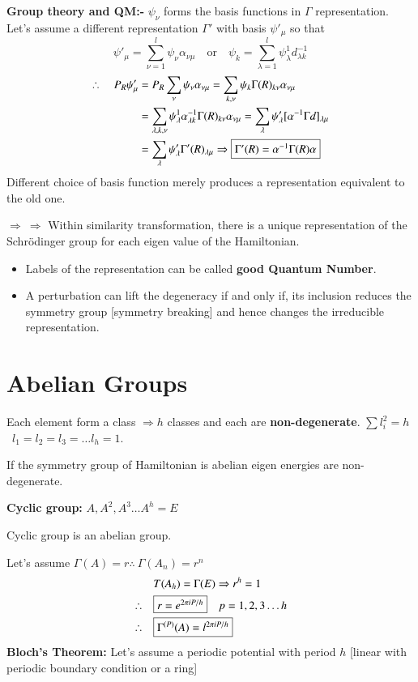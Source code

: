 \noindent
{\bf Group theory and QM:-}
$\psi_{\nu}$ forms the basis functions in $\Gamma$ representation. Let's assume a different representation $\Gamma'$ with basis $\psi'_{\mu}$ so that 
$$
\psi'_{\mu}=\sum\limits^{l}_{\nu=1}\psi_{\nu}\alpha_{\nu\mu}\quad\text{or}\quad \psi_{k}=\sum\limits^{l}_{\lambda=1}\psi^{1}_{\lambda}d^{-1}_{\lambda k}
$$
\begin{align*}
\therefore\quad P_{R}\psi'_{\mu} &= P_{R}\sum\limits_{\nu}\psi_{\nu}\alpha_{\nu\mu}=\sum\limits_{k,\nu}\psi_{k}\Gamma(R)_{k\nu}\alpha_{\nu\mu}\\
&= \sum\limits_{\lambda,k,\nu}\psi^{1}_{\lambda}\alpha^{-1}_{\lambda k}\Gamma(R)_{k\nu}\alpha_{\nu\mu}=\sum\limits_{\lambda}\psi'_{\lambda}[\alpha^{-1}\Gamma d]_{\lambda\mu}\\
&= \sum\limits_{\lambda}\psi'_{\lambda}\Gamma'(R)_{\lambda\mu}\Rightarrow \fbox{$\Gamma'(R)=\alpha^{-1}\Gamma(R)\alpha$}
\end{align*}
Different choice of basis function merely produces a representation equivalent to the old one.

$\Rightarrow \ \Rightarrow$ Within similarity transformation, there is a unique representation of the Schr\"odinger group for each eigen value of the Hamiltonian.
\begin{itemize}
\item Labels of the representation can be called {\bf good Quantum Number}.

\item A perturbation can lift the degeneracy if and only if, its inclusion reduces the symmetry group [symmetry breaking] and hence changes the irreducible representation.
\end{itemize}

\section*{Abelian Groups}

Each element form a class $\Rightarrow h$ classes and each are {\bf non-degenerate}. $\sum l^{2}_{i}=h$ \ $l_{1}=l_{2}=l_{3}=\ldots l_{h}=1$.

If the symmetry group of Hamiltonian is abelian eigen energies are non-degenerate.

\smallskip
\noindent
{\bf Cyclic group:} $A, A^{2},A^{3}\ldots A^{h}=E$

Cyclic group is an abelian group.

Let's assume $\Gamma(A)=r$\quad $\therefore \ \Gamma(A_{n})=r^{n}$
\begin{align*}
 & T(A_{h})=\Gamma(E)\Rightarrow r^{h}=1\\
\therefore\quad &\fbox{$r=e^{2\pi iP/h}$}\quad p=1,2,3\ldots h\\
\therefore\quad &\fbox{$\Gamma^{(P)}(A)=l^{2\pi iP/h}$}
\end{align*}
{\bf Bloch's Theorem:} Let's assume a periodic potential with period $h$ [linear with periodic boundary condition or a ring]

